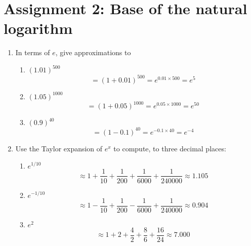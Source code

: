\documentclass{article}
\begin{document}
\section{Assignment 2: Base of the natural logarithm}
\begin{enumerate}
\item{In terms of $e$, give approximations to
\begin{enumerate}
\item{$(1.01)^{500}$
\[ = (1 + 0.01)^{500} = e^{0.01 \times 500} = e^5 \]}
\item{$(1.05)^{1000}$
\[ = (1 + 0.05)^{1000} = e^{0.05 \times 1000} = e^{50} \]}
\item{$(0.9)^{40}$
\[ = (1 - 0.1)^{40} = e^{-0.1 \times 40} = e^{-4} \]}
\end{enumerate}
}
\item{Use the Taylor expansion of $e^x$ to compute, to three decimal places:
\begin{enumerate}
\item{$e^{1/10}$
\[ \approx 1 + \frac{1}{10} + \frac{1}{200} + \frac{1}{6000} + \frac{1}{240000} \approx 1.105 \]
}
\item{$e^{-1/10}$
\[ \approx 1 - \frac{1}{10} + \frac{1}{200} - \frac{1}{6000} + \frac{1}{240000} \approx 0.904 \]
}
\item{$e^2$
\[ \approx 1 + 2 + \frac{4}{2} + \frac{8}{6} + \frac{16}{24} \approx 7.000 \]
}
\end{enumerate}
}

\end{enumerate}
\end{document}
